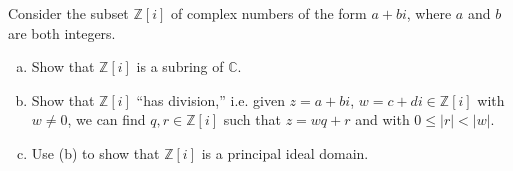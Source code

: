 \documentclass{article}
\newcounter{Problem}
\newenvironment{Problem}{\begin{Exercise}[name={Problem},
                                          counter={Problem}]}
                        {\end{Exercise}}
\begin{document}
\pagebreak

\begin{Problem}
  Consider the subset $\mathbb{Z}[i]$ of complex numbers of the form
  $a + bi$, where $a$ and $b$ are both integers.
  \begin{enumerate}[(a)]
    \item{
      Show that $\mathbb{Z}[i]$ is a subring of $\mathbb{C}$.
    }
    \item{
      Show that $\mathbb{Z}[i]$ ``has division,'' i.e. given
      $z = a + bi$, $w = c + di \in \mathbb{Z}[i]$ with $w \neq 0$, we
      can find $q, r \in \mathbb{Z}[i]$ such that $z = wq + r$ and
      with $0 \leq |r| < |w|$.
    }
    \item{
      Use (b) to show that $\mathbb{Z}[i]$ is a principal ideal domain.
    }
  \end{enumerate}
\end{Problem}
\end{document}
